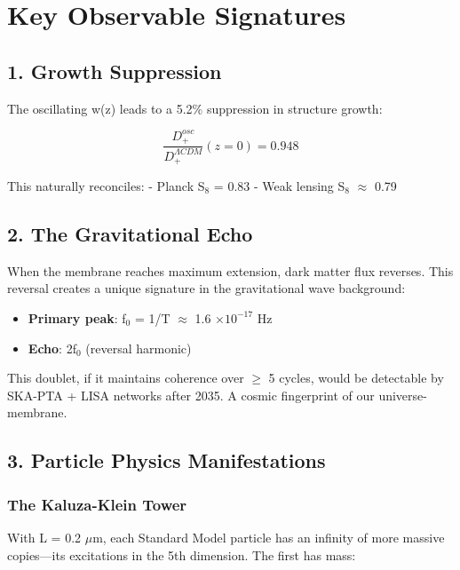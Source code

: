 \documentclass[
  11pt,
]{report}
\providecommand{\tightlist}{%
  \setlength{\itemsep}{0pt}\setlength{\parskip}{0pt}}
\begin{document}
\section{Key Observable Signatures}\label{key-observable-signatures}

\subsection{1. Growth Suppression}\label{growth-suppression}

The oscillating w(z) leads to a 5.2\% suppression in structure growth:

\[\frac{D_+^{osc}}{D_+^{ΛCDM}}(z=0) = 0.948\]

This naturally reconciles: - Planck S\(_8\) = 0.83 - Weak lensing
S\(_8\) \(\approx\) 0.79

\subsection{2. The Gravitational Echo}\label{the-gravitational-echo}

When the membrane reaches maximum extension, dark matter flux reverses.
This reversal creates a unique signature in the gravitational wave
background:

\begin{itemize}
\tightlist
\item
  \textbf{Primary peak}: f\(_0\) = 1/T \(\approx\) 1.6
  \(\times 10^{-17}\) Hz
\item
  \textbf{Echo}: 2f\(_0\) (reversal harmonic)
\end{itemize}

This doublet, if it maintains coherence over \(\geq\) 5 cycles, would be
detectable by SKA-PTA + LISA networks after 2035. A cosmic fingerprint
of our universe-membrane.

\subsection{3. Particle Physics
Manifestations}\label{particle-physics-manifestations-1}

\subsubsection{The Kaluza-Klein Tower}\label{the-kaluza-klein-tower-1}

With L = 0.2 \(\mu\)m, each Standard Model particle has an infinity of
more massive copies---its excitations in the 5th dimension. The first
has mass:
\end{document}
